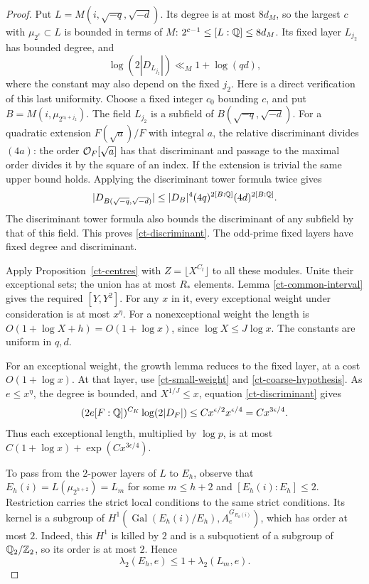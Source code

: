 \begin{proof}
Put $L=M(i,\sqrt{-q},\sqrt{-d})$. Its degree is at most
$8d_M$, so the largest $c$ with $\mu_{2^c}\subset L$ is bounded
in terms of $M$: $2^{c-1}\le[L:\mathbb Q]\le8d_M$.
Its fixed layer $L_{j_2}$ has bounded degree, and
\begin{equation}
 \label{ct-discriminant}
        \log(2|D_{L_{j_2}}|)\ll_M 1+\log(qd),
\end{equation}
where the constant may also depend on the fixed $j_2$.
Here is a direct verification of this last uniformity. Choose a
fixed integer $c_0$ bounding $c$, and put
$B=M(i,\mu_{2^{c_0+j_2}})$. The field $L_{j_2}$ is a subfield
of $B(\sqrt{-q},\sqrt{-d})$. For a quadratic extension
$F(\sqrt a)/F$ with integral $a$, the relative discriminant
divides $(4a)$: the order $\mathcal O_F[\sqrt a]$ has that
discriminant and passage to the maximal order divides it by the
square of an index. If the extension is trivial the same upper
bound holds. Applying the discriminant tower formula twice gives
\[
 |D_{B(\sqrt{-q},\sqrt{-d})}|
 \le |D_B|^4(4q)^{2[B:\mathbb Q]}(4d)^{2[B:\mathbb Q]}.
\]
The discriminant tower formula also bounds the discriminant of
any subfield by that of this field. This proves
\eqref{ct-discriminant}. The odd-prime fixed layers have fixed
degree and discriminant.

Apply Proposition~\ref{ct-centres} with
$Z=\lfloor X^{C_t}\rfloor$ to all these modules. Unite their
exceptional sets; the union has at most $R_*$ elements. Lemma
\ref{ct-common-interval} gives the required $[Y,Y^2]$. For any
$x$ in it, every exceptional weight under consideration is at
most $x^\eta$. For a nonexceptional weight the length is
$O(1+\log X+h)=O(1+\log x)$, since
$\log X\le J\log x$. The constants are uniform in $q,d$.

For an exceptional weight, the growth lemma reduces to the fixed
layer, at a cost $O(1+\log x)$. At that layer, use
\eqref{ct-small-weight} and \eqref{ct-coarse-hypothesis}.
As $e\le x^\eta$, the degree is bounded, and
$X^{1/J}\le x$, equation \eqref{ct-discriminant} gives
\[
 (2e[F:\mathbb Q])^{C_K}\log(2|D_F|)
       \le C x^{\epsilon/2}x^{\epsilon/4}
       =C x^{3\epsilon/4}.
\]
Thus each exceptional length, multiplied by $\log p$, is at most
$C(1+\log x)+\exp(Cx^{3\epsilon/4})$.

To pass from the $2$-power layers of $L$ to $E_h$, observe that
$E_h(i)=L(\mu_{2^{h+2}})=L_m$ for some $m\le h+2$ and
$[E_h(i):E_h]\le2$. Restriction carries the strict local
conditions to the same strict conditions. Its kernel is a
subgroup of
$H^1(\operatorname{Gal}(E_h(i)/E_h),A_e^{G_{E_h(i)}})$,
which has order at most $2$. Indeed, this $H^1$ is killed by $2$
and is a subquotient of a subgroup of $\mathbb Q_2/\mathbb Z_2$, so its
order is at most $2$. Hence
\[
                    \lambda_2(E_h,e)\le1+\lambda_2(L_m,e).
\]


\end{proof}
